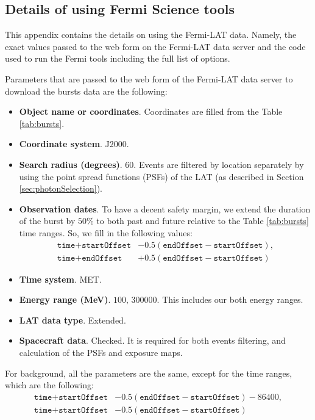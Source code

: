 \documentclass{article}
\begin{document}
\begin{appendices}

\section{Details of using Fermi Science tools}
\label{sec:fermiCode}
This appendix contains the details on using the Fermi-LAT
data. Namely, the exact values passed to the web form on the Fermi-LAT
data server and the code used to run the Fermi tools including the
full list of options.

Parameters that are passed to the web form of the Fermi-LAT data server to download the bursts data are the following:
\begin{itemize}
	\item{
		{\bf Object name or coordinates}.
		Coordinates are filled from the Table \ref{tab:bursts}.
	}
	\item{
		{\bf Coordinate system}.
		J2000.
	}
	\item{
		{\bf Search radius (degrees)}.
		$60$.
		Events are filtered by location separately by using the point spread functions (PSFs) of the LAT (as described in Section \ref{sec:photonSelection}).
	}
	\item{
		{\bf Observation dates}.
		To have a decent safety margin, we extend the duration of the burst by $50\%$ to both past and future relative to the Table \ref{tab:bursts} time ranges.
		So, we fill in the following values:
		\begin{align*}
			\texttt{time} + \texttt{startOffset} &- 0.5\left(\texttt{endOffset}-\texttt{startOffset}\right),\\
			\texttt{time} + \texttt{endOffset} &+ 0.5\left(\texttt{endOffset}-\texttt{startOffset}\right)
		\end{align*}
	}
	\item{
		{\bf Time system}.
		MET.
	}
	\item{
		{\bf Energy range (MeV)}.
		$100,\,300000$.
		This includes our both energy ranges.
	}
	\item{
		{\bf LAT data type}.
		Extended.
	}
	\item{
		{\bf Spacecraft data}.
		Checked.
		It is required for both events filtering, and calculation of the PSFs and exposure maps.
	}
\end{itemize}

For background, all the parameters are the same, except for the time ranges, which are the following:
\begin{align*}
	\texttt{time} + \texttt{startOffset} &- 0.5\left(\texttt{endOffset} - \texttt{startOffset}\right) - 86400,\\
	\texttt{time} + \texttt{startOffset} &- 0.5\left(\texttt{endOffset} - \texttt{startOffset}\right)
\end{align*}


\end{appendices}
\end{document}

